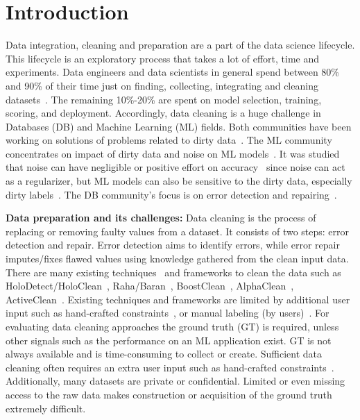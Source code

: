 \chapter{Introduction}
Data integration, cleaning and preparation are a part of the data science lifecycle. 
This lifecycle is an exploratory process that takes a lot of effort, time and experiments.
Data engineers and data scientists in general spend between 80\% and 90\% of their time just on finding, collecting, integrating and cleaning datasets~\cite{80cleansurvey, dataintegration80}. The remaining 10\%-20\% are spent on model selection, training, scoring, and deployment.
Accordingly, data cleaning is a huge challenge in Databases (DB) and Machine Learning (ML) fields.
Both communities have been working on solutions of problems related to dirty data~\cite{cleanml}. 
The ML community concentrates on impact of dirty data and noise on ML models~\cite{cleanml}.
It was studied that noise can have negligible or positive effort on accuracy~\cite{processingsys, outperformstudy} since noise can act as a regularizer, but ML models can also be sensitive to the dirty data, especially dirty labels~\cite{classificationnoisesurvey}.
The DB community's focus is on error detection and repairing~\cite{Hellerstein08quantitativedata, duplicatesstudy}.

\textbf{Data preparation and its challenges:}
Data cleaning is the process of replacing or removing faulty values from a dataset.
It consists of two steps: error detection and repair.
Error detection aims to identify errors, while error repair imputes/fixes flawed values using knowledge gathered from the clean input data. 
There are many existing techniques~\cite{duplicatesstudy, tdeexcel} and frameworks to clean the data such as HoloDetect/HoloClean~\cite{holodetect, RekatsinasCIR2017}, Raha/Baran~\cite{raha, baran}, BoostClean~\cite{boostclean}, AlphaClean~\cite{alphaclean}, ActiveClean~\cite{activeclean}. 
Existing techniques and frameworks are limited by additional user input such as hand-crafted constraints~\cite{bart}, or manual labeling (by users)~\cite{raha, baran}.
For evaluating data cleaning approaches the ground truth (GT) is required, unless other signals such as the performance on an ML application exist.
GT is not always available and is time-consuming to collect or create.
Sufficient data cleaning often requires an extra user input such as hand-crafted constraints~\cite{bart}.
Additionally, many datasets are private or confidential. 
Limited or even missing access to the raw data makes construction or acquisition of the ground truth extremely difficult. 

